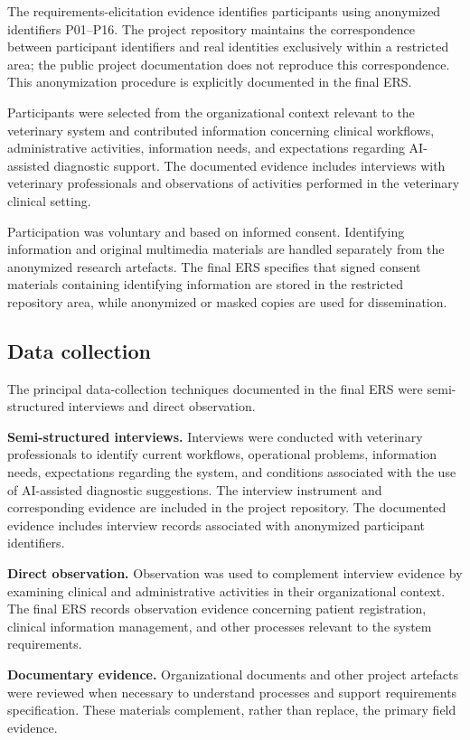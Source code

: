 \documentclass[pdflatex,sn-mathphys-num,Numbered]{sn-jnl}
\begin{document}
The requirements-elicitation evidence identifies participants using anonymized identifiers P01--P16. The project repository maintains the correspondence between participant identifiers and real identities exclusively within a restricted area; the public project documentation does not reproduce this correspondence. This anonymization procedure is explicitly documented in the final ERS.

Participants were selected from the organizational context relevant to the veterinary system and contributed information concerning clinical workflows, administrative activities, information needs, and expectations regarding AI-assisted diagnostic support. The documented evidence includes interviews with veterinary professionals and observations of activities performed in the veterinary clinical setting.

Participation was voluntary and based on informed consent. Identifying information and original multimedia materials are handled separately from the anonymized research artefacts. The final ERS specifies that signed consent materials containing identifying information are stored in the restricted repository area, while anonymized or masked copies are used for dissemination.

\subsection{Data collection}\label{subsec4}

The principal data-collection techniques documented in the final ERS were semi-structured interviews and direct observation.

\textbf{Semi-structured interviews.} Interviews were conducted with veterinary professionals to identify current workflows, operational problems, information needs, expectations regarding the system, and conditions associated with the use of AI-assisted diagnostic suggestions. The interview instrument and corresponding evidence are included in the project repository. The documented evidence includes interview records associated with anonymized participant identifiers.

\textbf{Direct observation.} Observation was used to complement interview evidence by examining clinical and administrative activities in their organizational context. The final ERS records observation evidence concerning patient registration, clinical information management, and other processes relevant to the system requirements.

\textbf{Documentary evidence.} Organizational documents and other project artefacts were reviewed when necessary to understand processes and support requirements specification. These materials complement, rather than replace, the primary field evidence.
\end{document}
